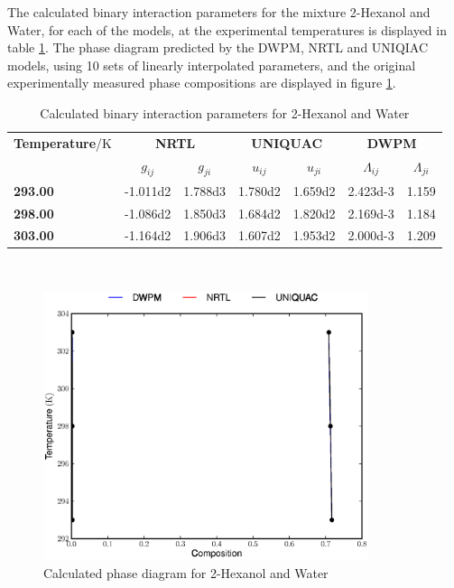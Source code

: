 
The calculated binary interaction parameters for the mixture 2-Hexanol and Water, for each of the models, at the experimental temperatures is displayed in table \ref{2HexanolWaterTable}. The phase diagram predicted by the DWPM, NRTL and UNIQIAC models, using 10 sets of linearly interpolated parameters, and the original experimentally measured phase compositions are displayed in figure \ref{hexanol-waterFigure}.\\

\begin{landscape}
\vspace*{\fill}
\begin{table}[h]
\caption{Calculated binary interaction parameters for 2-Hexanol and Water} 
\centering
\begin{tabular}{lcccccc}
\toprule
\textbf{Temperature}/$\mathrm{K}$&\multicolumn{2}{c}{\textbf{NRTL}}&\multicolumn{2}{c}{\textbf{UNIQUAC}}&\multicolumn{2}{c}{\textbf{DWPM}}\\
\cmidrule(r){2-7}
&$g_{ij}$&$g_{ji}$&$u_{ij}$&$u_{ji}$&$\Lambda_{ij}$&$\Lambda_{ji}$\\
\midrule
\textbf{ 293.00 } & \num{-1.011d2} & \num{1.788d3} & \num{1.780d2} & \num{1.659d2} & \num{2.423d-3} & \num{1.159}\\
\textbf{ 298.00 } & \num{-1.086d2} & \num{1.850d3} & \num{1.684d2} & \num{1.820d2} & \num{2.169d-3} & \num{1.184}\\
\textbf{ 303.00 } & \num{-1.164d2} & \num{1.906d3} & \num{1.607d2} & \num{1.953d2} & \num{2.000d-3} & \num{1.209}\\
\bottomrule
\end{tabular}\\
\label{2HexanolWaterTable}
\end{table}
\vspace*{\fill}
\end{landscape}

\begin{figure}[hp]
\centering
\includegraphics[width = 0.85\textwidth]{Results_Parts/BinaryParams/2-hexanol-water/PhaseDiagram.eps}
\caption{Calculated phase diagram for 2-Hexanol and Water} \label{hexanol-waterFigure}
\end{figure}\

